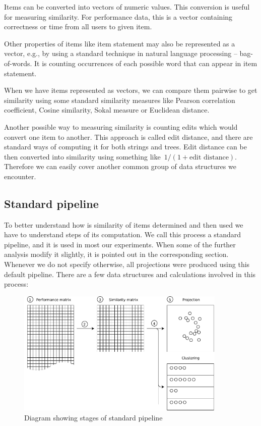 \documentclass[
  printed, %
  table,   %
  nolof,     %
  nolot,     %
  color,
  final,
  nocover
]{fithesis3}
\begin{document}

Items can be converted into vectors of numeric values. This conversion is useful for measuring similarity. For performance data, this is a vector containing correctness or time from all users to given item.

Other properties of items like item statement may also be represented as a vector, e.g., by using a standard technique in natural language processing -- bag-of-words. It is counting occurrences of each possible word that can appear in item statement.

When we have items represented as vectors, we can compare them pairwise to get similarity using some standard similarity measures like Pearson correlation coefficient, Cosine similarity, Sokal measure or Euclidean distance.


Another possible way to measuring similarity is counting edits which would convert one item to another. This approach is called edit distance, and there are standard ways of computing it for both strings and trees. Edit distance can be then converted into similarity using something like~$1 / (1 + \text{edit distance})$. Therefore we can easily cover another common group of data structures we encounter.


\subsection{Standard pipeline}\label{standard-pipeline}


To better understand how is similarity of items determined and then used we have to understand steps of its computation. We call this process a standard pipeline, and it is used in most our experiments. When some of the further analysis modify it slightly, it is pointed out in the corresponding section. Whenever we do not specify otherwise, all projections were produced using this default pipeline. There are a few data structures and calculations involved in this process:

\begin{figure}
  \includegraphics[width=10cm]{img/pipeline_diagram}
  \caption{Diagram showing stages of standard pipeline}
  \label{fig:pipeline_diagram}
\end{figure}
\end{document}
